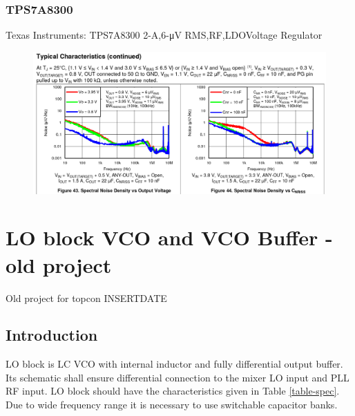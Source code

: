 \documentclass{article}
\begin{document}

\subsubsection*{TPS7A8300}

Texas Instruments: TPS7A8300 2-A,6-\unit{\micro\volt} RMS,RF,LDOVoltage Regulator

\begin{figure}[ht!]
	\includegraphics[width=0.5\linewidth]{Figures/LDO-noise-characteristic.png}
	\label{fig:ldo-noise-documntation}
\end{figure}



\newpage

\section{LO block VCO and VCO Buffer - old project}

Old project for topcon INSERTDATE %

\subsection{Introduction} %

LO block is LC VCO with internal inductor and fully differential output buffer. Its schematic shall ensure differential connection to the mixer LO input and PLL RF input. LO block should have the characteristics given in Table \ref{table-spec}. Due to wide frequency range it is necessary to use switchable capacitor banks.  

\end{document}
